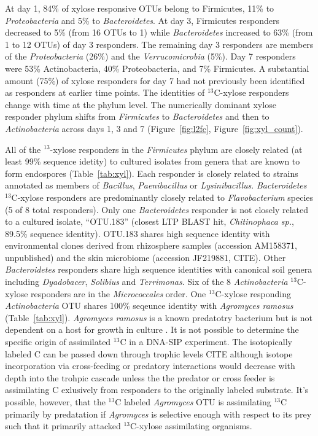 At day 1, 84\% of xylose responsive OTUs belong to Firmicutes, 11\% to
\textit{Proteobacteria} and 5\% to \textit{Bacteroidetes}. At day 3,
Firmicutes responders decreased to 5\% (from 16 OTUs to 1) while
\textit{Bacteroidetes} increased to 63\% (from 1 to 12 OTUs) of day 3
responders. The remaining day 3 responders are members of the
\textit{Proteobacteria} (26\%) and the \textit{Verrucomicrobia} (5\%). Day 7
responders were 53\% Actinobacteria, 40\% Proteobacteria, and 7\% Firmicutes. A
substantial amount (75\%) of xylose responders for day 7 had not previously
been identified as responders at earlier time points. The identities of $^{13}$C-xylose
responders change with time at the phylum level. The numerically dominant xylose
responder phylum shifts from \textit{Firmicutes} to \textit{Bacteroidetes} and
then to \textit{Actinobacteria} across days 1, 3 and 7 (Figure~\ref{fig:l2fc},
Figure~\ref{fig:xyl_count}). 

All of the $^{13}$-xylose responders in the \textit{Firmicutes} phylum are
closely related (at least 99\% sequence idetity) to cultured isolates from
genera that are known to form endospores (Table~\ref{tab:xyl}). Each responder is closely
related to strains annotated as members of \textit{Bacillus},
\textit{Paenibacillus} or \textit{Lysinibacillus}. \textit{Bacteroidetes}
$^{13}$C-xylose responders are predominantly closely related to
\textit{Flavobacterium} species (5 of 8 total responders). Only one
\textit{Bacteroidetes} responder is not closely related to a cultured isolate,
``OTU.183'' (closest LTP BLAST hit, \textit{Chitinophaca sp.}, 89.5\% sequence
identity). OTU.183 shares high sequence identity with environmental clones
derived from rhizosphere samples (accession AM158371, unpublished) and the skin
microbiome (accession JF219881, CITE). Other \textit{Bacteroidetes} responders
share high sequence identities with canonical soil genera including
\textit{Dyadobacer}, \textit{Solibius} and \textit{Terrimonas}. Six of the 8
\textit{Actinobacteria} $^{13}$C-xylose responders are in the
\textit{Micrococcales} order. One $^{13}$C-xylose responding
\textit{Actinobacteria} OTU shares 100\% seqeunce identity with
\textit{Agromyces ramosus} (Table~\ref{tab:xyl}).  \textit{Agromyces ramosus} is a known
predatotry bacterium but is not dependent on a host for growth in culture
\citep{16346402}. It is not possible to determine the specific origin of assimilated
$^{13}$C in a DNA-SIP experiment. The isotopically labeled C can be passed down
through trophic levels CITE although isotope incorporation via cross-feeding or predatory
interactions would decrease with depth into the trohpic cascade unless the the predator or 
cross feeder is assimilating C exlusively from responders to the originally labeled substrate. It's possible, however, that the $^{13}$C labeled
\textit{Agromyces} OTU is assimilating $^{13}$C primarily by predatation if \textit{Agromyces} is selective enough with respect to its prey such that it primarily attacked $^{13}$C-xylose assimilating organisms.

